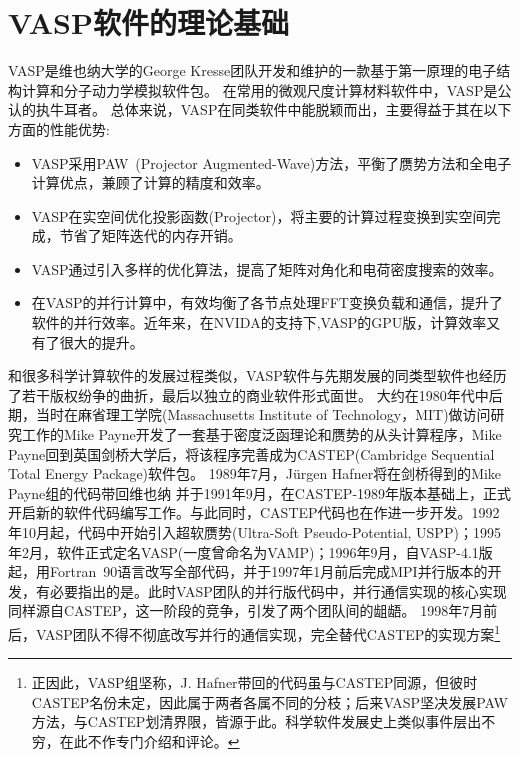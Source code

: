 \chapter{\rm{VASP}软件的理论基础}
\textrm{VASP}是维也纳大学的\textrm{George Kresse}团队开发和维护的一款基于第一原理的电子结构计算和分子动力学模拟软件包。
在常用的微观尺度计算材料软件中，\textrm{VASP}是公认的执牛耳者。
总体来说，\textrm{VASP}在同类软件中能脱颖而出，主要得益于其在以下方面的性能优势:
\begin{itemize}
	\item \textrm{VASP}采用\textrm{PAW~(Projector Augmented-Wave)}方法，平衡了赝势方法和全电子计算优点，兼顾了计算的精度和效率。
		\item \textrm{VASP}在实空间优化投影函数\textrm{(Projector)}，将主要的计算过程变换到实空间完成，节省了矩阵迭代的内存开销。%
		\item \textrm{VASP}通过引入多样的优化算法，提高了矩阵对角化和电荷密度搜索的效率。
		\item 在\textrm{VASP}的并行计算中，有效均衡了各节点处理\textrm{FFT}变换负载和通信，提升了软件的并行效率。近年来，在\textrm{NVIDA}的支持下,\textrm{VASP}的\textrm{GPU}版，计算效率又有了很大的提升。
\end{itemize}
和很多科学计算软件的发展过程类似，\textrm{VASP}软件与先期发展的同类型软件也经历了若干版权纷争的曲折，最后以独立的商业软件形式面世。
大约在1980年代中后期，当时在麻省理工学院\textrm{(Massachusetts Institute of Technology，MIT)}做访问研究工作的\textrm{Mike Payne}开发了一套基于密度泛函理论和赝势的从头计算程序，\textrm{Mike Payne}回到英国剑桥大学后，将该程序完善成为\textrm{CASTEP(Cambridge Sequential Total Energy Package)}软件包。
1989年7月，\textrm{J\"urgen Hafner}将在剑桥得到的\textrm{Mike Payne}组的代码带回维也纳%
并于1991年9月，在\textrm{CASTEP-1989}年版本基础上，正式开启新的软件代码编写工作。与此同时，\textrm{CASTEP}代码也在作进一步开发。1992年10月起，代码中开始引入超软赝势\textrm{(Ultra-Soft Pseudo-Potential, USPP)}；1995年2月，软件正式定名\textrm{VASP}(一度曾命名为\textrm{VAMP})；1996年9月，自\textrm{VASP}-4.1版起，用\textrm{Fortran~90}语言改写全部代码，并于1997年1月前后完成\textrm{MPI}并行版本的开发，有必要指出的是。此时\textrm{VASP}团队的并行版代码中，并行通信实现的核心实现同样源自\textrm{CASTEP}，这一阶段的竞争，引发了两个团队间的龃龉。
1998年7月前后，\textrm{VASP}团队不得不彻底改写并行的通信实现，完全替代\textrm{CASTEP}的实现方案\footnote{正因此，\textrm{VASP}组坚称，\textrm{J. Hafner}带回的代码虽与\textrm{CASTEP}同源，但彼时\textrm{CASTEP}名份未定，因此属于两者各属不同的分枝；后来\textrm{VASP}坚决发展\textrm{PAW}方法，与\textrm{CASTEP}划清界限，皆源于此。科学软件发展史上类似事件层出不穷，在此不作专门介绍和评论。}
